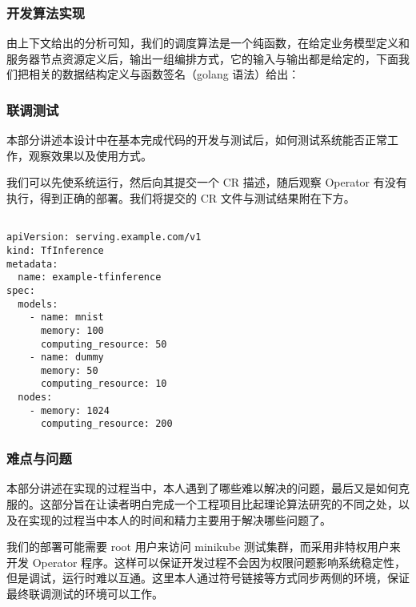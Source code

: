 \subsubsection{开发算法实现}

由上下文给出的分析可知，我们的调度算法是一个纯函数，在给定业务模型定义和服务器节点资源定义后，输出一组编排方式，它的输入与输出都是给定的，下面我们把相关的数据结构定义与函数签名（golang 语法）给出：


\subsubsection{联调测试}

本部分讲述本设计中在基本完成代码的开发与测试后，如何测试系统能否正常工作，观察效果以及使用方式。

我们可以先使系统运行，然后向其提交一个 CR 描述，随后观察 Operator 有没有执行，得到正确的部署。我们将提交的 CR 文件与测试结果附在下方。

\begin{lstlisting}

apiVersion: serving.example.com/v1
kind: TfInference
metadata:
  name: example-tfinference
spec:
  models:
    - name: mnist
      memory: 100
      computing_resource: 50
    - name: dummy
      memory: 50
      computing_resource: 10
  nodes:
    - memory: 1024
      computing_resource: 200

\end{lstlisting}




\subsubsection{难点与问题}

本部分讲述在实现的过程当中，本人遇到了哪些难以解决的问题，最后又是如何克服的。这部分旨在让读者明白完成一个工程项目比起理论算法研究的不同之处，以及在实现的过程当中本人的时间和精力主要用于解决哪些问题了。


我们的部署可能需要 root 用户来访问 minikube 测试集群，而采用非特权用户来开发 Operator 程序。这样可以保证开发过程不会因为权限问题影响系统稳定性，但是调试，运行时难以互通。这里本人通过符号链接等方式同步两侧的环境，保证最终联调测试的环境可以工作。

